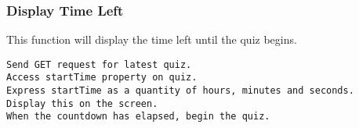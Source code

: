 \subsubsection{Display Time Left}
This function will display the time left until the quiz begins.
\begin{verbatim}
Send GET request for latest quiz.
Access startTime property on quiz.
Express startTime as a quantity of hours, minutes and seconds.
Display this on the screen.
When the countdown has elapsed, begin the quiz.
\end{verbatim}
